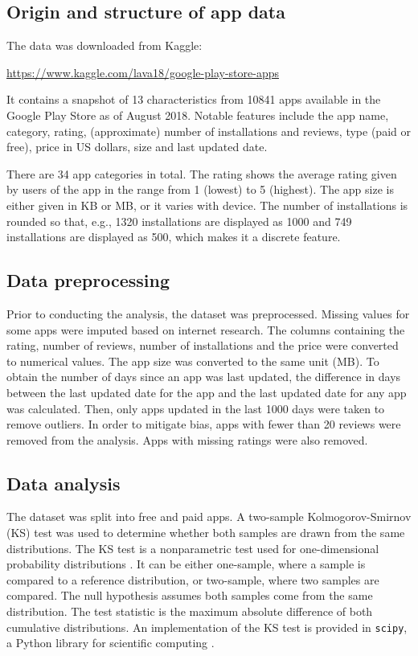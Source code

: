 \documentclass{article}
\begin{document}
\subsection{Origin and structure of app data}

The data was downloaded from Kaggle:
\begin{center}
    \url{https://www.kaggle.com/lava18/google-play-store-apps}
\end{center} It contains a snapshot of 13 characteristics from 10841 apps available in the Google Play Store as of August 2018. Notable features include the app name, category, rating, (approximate) number of installations and reviews, type (paid or free), price in US dollars, size and last updated date. 

There are 34 app categories in total. The rating shows the average rating given by users of the app in the range from 1 (lowest) to 5 (highest). The app size is either given in KB or MB, or it varies with device. The number of installations is rounded so that, e.g., 1320 installations are displayed as 1000 and 749 installations are displayed as 500, which makes it a discrete feature.

\subsection{Data preprocessing}

Prior to conducting the analysis, the dataset was preprocessed. Missing values for some apps were imputed based on internet research. The columns containing the rating, number of reviews, number of installations and the price were converted to numerical values. The app size was converted to the same unit (MB). To obtain the number of days since an app was last updated, the difference in days between the last updated date for the app and the last updated date for any app was calculated. Then, only apps updated in the last 1000 days were taken to remove outliers. In order to mitigate bias, apps with fewer than 20 reviews were removed from the analysis. Apps with missing ratings were also removed.

\subsection{Data analysis}

The dataset was split into free and paid apps. A two-sample Kolmogorov-Smirnov (KS) test was used to determine whether both samples are drawn from the same distributions. The KS test is a nonparametric test used for one-dimensional probability distributions \cite{kstest}. It can be either one-sample, where a sample is compared to a reference distribution, or two-sample, where two samples are compared. The null hypothesis assumes both samples come from the same distribution. The test statistic is the maximum absolute difference of both cumulative distributions. An implementation of the KS test is provided in \verb+scipy+, a Python library for scientific computing \cite{scipy}.
\end{document}

